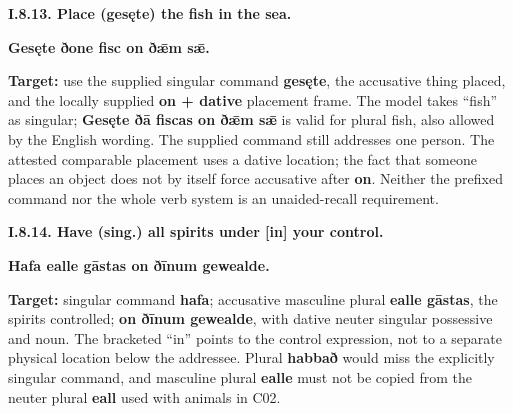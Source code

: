 \par\begin{minipage}{\linewidth}\raggedright
\textbf{I.8.13. Place (gesęte) the fish in the sea.}

\textbf{Gesęte ðone fisc on ðǣm sǣ.}

\textbf{Target:} use the supplied singular command \textbf{gesęte}, the accusative thing placed, and the locally supplied \textbf{on + dative} placement frame. The model takes “fish” as singular; \textbf{Gesęte ðā fiscas on ðǣm sǣ} is valid for plural fish, also allowed by the English wording. The supplied command still addresses one person. The attested comparable placement uses a dative location; the fact that someone places an object does not by itself force accusative after \textbf{on}. Neither the prefixed command nor the whole verb system is an unaided-recall requirement.

\end{minipage}\par\addvspace{4pt}

\par\begin{minipage}{\linewidth}\raggedright
\textbf{I.8.14. Have (sing.) all spirits under [in] your control.}

\textbf{Hafa ealle gāstas on ðīnum gewealde.}

\textbf{Target:} singular command \textbf{hafa}; accusative masculine plural \textbf{ealle gāstas}, the spirits controlled; \textbf{on ðīnum gewealde}, with dative neuter singular possessive and noun. The bracketed “in” points to the control expression, not to a separate physical location below the addressee. Plural \textbf{habbað} would miss the explicitly singular command, and masculine plural \textbf{ealle} must not be copied from the neuter plural \textbf{eall} used with animals in C02.

\end{minipage}\par\addvspace{4pt}

